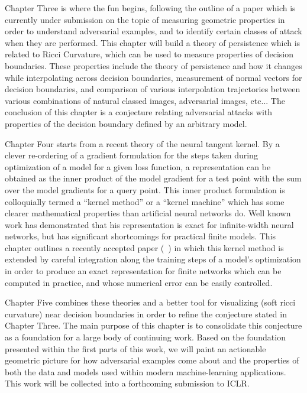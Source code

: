 Chapter Three is where the fun begins,
following the outline of a paper which is currently under submission
on the topic of measuring geometric properties in order to understand
adversarial examples, and to identify certain classes of attack when
they are performed. This chapter will build a theory of persistence
which is related to Ricci Curvature, which can be used to measure
properties of decision boundaries. These properties include the theory
of persistence and how it changes while interpolating across decision
boundaries, measurement of normal vectors for decision boundaries, and
comparison of various interpolation trajectories between various
combinations of natural classed images, adversarial images, etc... The
conclusion of this chapter is a conjecture relating adversarial
attacks with properties of the decision boundary defined by an
arbitrary model. 

Chapter Four starts
from a recent theory of the neural tangent kernel. By a clever
re-ordering of a gradient formulation for the steps taken during
optimization of a model for a given loss function, a representation
can be obtained as the inner product of the model gradient for a test
point with the sum over the model gradients for a query point. This
inner product formulation is colloquially termed a ``kernel method''
or a ``kernel machine'' which has some clearer mathematical properties
than artificial neural networks do. Well known work has demonstrated
that his representation is exact for infinite-width neural networks,
but has significant shortcomings for practical finite models. This
chapter outlines a recently accepted paper (~\cite{bell2023icml}) in
which this kernel method is extended by careful integration along the
training steps of a model's optimization in order to produce an exact
representation for finite networks which can be computed in practice,
and whose numerical error can be easily controlled.

Chapter Five combines these theories and a better tool for
visualizing (soft ricci curvature) near decision boundaries in order
to refine the conjecture stated in Chapter Three. The main purpose of
this chapter is to consolidate this conjecture as a foundation for a
large body of continuing work. Based on the foundation presented
within the first parts of this work, we will paint an actionable
geometric picture for how adversarial examples come about and the
properties of both the data and models used within modern
machine-learning applications. This work will be collected into a
forthcoming submission to ICLR. 

